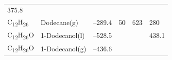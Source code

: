 \documentclass[
]{book}
\theoremstyle{definition}
\theoremstyle{definition}
\theoremstyle{definition}
\theoremstyle{remark}
\begin{document}
\begin{longtable}[]{@{}llllll@{}}
\begin{minipage}[t]{0.14\columnwidth}
375.8\strut
\end{minipage}\tabularnewline
\begin{minipage}[t]{0.07\columnwidth}\raggedright
C\textsubscript{12}H\textsubscript{26}\strut
\end{minipage} & \begin{minipage}[t]{0.17\columnwidth}\raggedright
Dodecane(g)\strut
\end{minipage} & \begin{minipage}[t]{0.15\columnwidth}\raggedright
--289.4\strut
\end{minipage} & \begin{minipage}[t]{0.15\columnwidth}\raggedright
50\strut
\end{minipage} & \begin{minipage}[t]{0.14\columnwidth}\raggedright
623\strut
\end{minipage} & \begin{minipage}[t]{0.14\columnwidth}\raggedright
280\strut
\end{minipage}\tabularnewline
\begin{minipage}[t]{0.07\columnwidth}\raggedright
C\textsubscript{12}H\textsubscript{26}O\strut
\end{minipage} & \begin{minipage}[t]{0.17\columnwidth}\raggedright
1-Dodecanol(l)\strut
\end{minipage} & \begin{minipage}[t]{0.15\columnwidth}\raggedright
--528.5\strut
\end{minipage} & \begin{minipage}[t]{0.15\columnwidth}\raggedright
\strut
\end{minipage} & \begin{minipage}[t]{0.14\columnwidth}\raggedright
\strut
\end{minipage} & \begin{minipage}[t]{0.14\columnwidth}\raggedright
438.1\strut
\end{minipage}\tabularnewline
\begin{minipage}[t]{0.07\columnwidth}\raggedright
C\textsubscript{12}H\textsubscript{26}O\strut
\end{minipage} & \begin{minipage}[t]{0.17\columnwidth}\raggedright
1-Dodecanol(g)\strut
\end{minipage} & \begin{minipage}[t]{0.15\columnwidth}\raggedright
--436.6\strut
\end{minipage} & \begin{minipage}[t]{0.15\columnwidth}\raggedright

\end{minipage}
\end{longtable}
\end{document}
